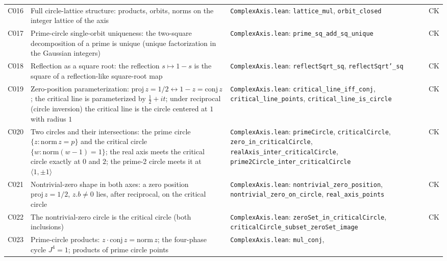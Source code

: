 \documentclass[sigplan,10pt,anonymous,review]{acmart}
\begin{document}
\begin{center}
\begin{tabular}{@{}p{1.5cm}p{5.4cm}p{5.4cm}p{0.8cm}@{}}
C016 & Full circle-lattice structure: products, orbits, norms on the
integer lattice of the axis & \texttt{ComplexAxis.lean}:
\texttt{lattice\_mul}, \texttt{orbit\_closed} & \textcolor{classical}{CK} \\
C017 & Prime-circle single-orbit uniqueness: the two-square decomposition
of a prime is unique (unique factorization in the Gaussian integers) &
\texttt{ComplexAxis.lean}: \texttt{prime\_sq\_add\_sq\_unique} &
\textcolor{classical}{CK} \\
C018 & Reflection as a square root: the reflection $s \mapsto 1-s$ is the
square of a reflection-like square-root map & \texttt{ComplexAxis.lean}:
\texttt{reflectSqrt\_sq}, \texttt{reflectSqrt'\_sq} &
\textcolor{classical}{CK} \\
C019 & Zero-position parameterization: $\mathrm{proj}\, z = 1/2
\leftrightarrow 1 - z = \mathrm{conj}\, z$; the critical line is
parameterized by $\frac12 + it$; under reciprocal (circle inversion) the
critical line is the circle centered at $1$ with radius $1$ &
\texttt{ComplexAxis.lean}: \texttt{critical\_line\_iff\_conj},
\texttt{critical\_line\_points}, \texttt{critical\_line\_is\_circle} &
\textcolor{classical}{CK} \\
C020 & Two circles and their intersections: the prime circle
$\{z : \mathrm{norm}\, z = p\}$ and the critical circle $\{w :
\mathrm{norm}(w-1) = 1\}$; the real axis meets the critical circle exactly
at $0$ and $2$; the prime-2 circle meets it at $\langle 1, \pm 1\rangle$ &
\texttt{ComplexAxis.lean}: \texttt{primeCircle},
\texttt{criticalCircle}, \texttt{zero\_in\_criticalCircle},
\texttt{realAxis\_inter\_criticalCircle},
\texttt{prime2Circle\_inter\_criticalCircle} & \textcolor{classical}{CK} \\
C021 & Nontrivial-zero shape in both axes: a zero position
$\mathrm{proj}\, z = 1/2$, $z.b \ne 0$ lies, after reciprocal, on the
critical circle & \texttt{ComplexAxis.lean}:
\texttt{nontrivial\_zero\_position}, \texttt{nontrivial\_zero\_on\_circle},
\texttt{real\_axis\_points} & \textcolor{classical}{CK} \\
C022 & The nontrivial-zero circle is the critical circle (both
inclusions) & \texttt{ComplexAxis.lean}:
\texttt{zeroSet\_in\_criticalCircle},
\texttt{criticalCircle\_subset\_zeroSet\_image} &
\textcolor{classical}{CK} \\
C023 & Prime-circle products: $z \cdot \mathrm{conj}\, z =
\mathrm{norm}\, z$; the four-phase cycle $J^4 = 1$; products of prime
circle points & \texttt{ComplexAxis.lean}: \texttt{mul\_conj},

\end{tabular}
\end{center}
\end{document}
